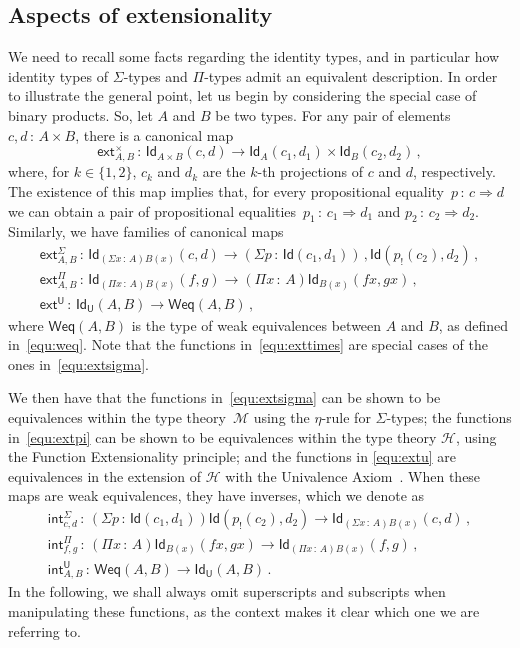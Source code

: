 \documentclass[10pt,a4paper,oneside,reqno]{amsart}
\numberwithin{equation}{section}
\theoremstyle{mythm}
\theoremstyle{mydef}
\theoremstyle{myrmk}
\newcommand{\co}{\,{:}\,}
\newcommand{\Hint}{\mathcal{H}}
\newcommand{\ext}{\mathsf{ext}}
\renewcommand{\int}{\mathsf{int}}
\newcommand{\Id}{\mathsf{Id}}
\newcommand{\U}{\mathsf{U}}
\begin{document}
\subsection*{Aspects of extensionality} We need to recall some facts regarding the identity types, and in particular how  identity types of $\Sigma$-types and $\Pi$-types admit an equivalent description. In order to illustrate the general point, let us begin by considering the special case of binary products. So, let $A$ and $B$ be two types. For any 
pair of elements $c, d  \co A \times B$, there is a canonical map
\begin{equation}
\label{equ:exttimes}
\ext^{\times}_{A, B}  \co \Id_{A \times B}(c, d) \to \Id_{A}(c_1, d_1) \times \Id_{B}(c_2, d_2) \, , 
\end{equation}
where, for $k \in \{ 1, 2 \}$,  $c_k$ and $d_k$ are the $k$-th projections of $c$ and $d$, respectively. The existence of this map implies that, for every 
propositional equality~$p \co c \Rightarrow d$ we can obtain a pair of propositional equalities~$p_1 \co c_1 \Rightarrow d_1$ and $p_2 \co c_2 \Rightarrow d_2$. Similarly, we
have families of canonical maps
\begin{gather}
\ext^\Sigma_{A,B} \co  \Id_{(\Sigma x \co A)B(x)}(c, d) \to (\Sigma p \co \Id(c_1, d_1)) \, , \Id( p_{!}(c_2), d_2) \, , 
\label{equ:extsigma} \\
\ext^\Pi_{A,B} \co  \Id_{(\Pi x \co A)B(x)}(f, g) \to (\Pi x \co A) \Id_{B(x)}(f x, gx)  \, , 
\label{equ:extpi} \\
\ext^\U \co  \Id_\U(A, B) \to \mathsf{Weq}(A, B) \, ,  \label{equ:extu}
\end{gather}
where $\mathsf{Weq}(A,B)$ is the type of weak equivalences between $A$ and $B$, as defined in~\eqref{equ:weq}.
Note that the functions in~\eqref{equ:exttimes} are special cases of the ones in~\eqref{equ:extsigma}.

We then have that the functions in~\eqref{equ:extsigma} can be shown to be 
equivalences within the type theory~$\mathcal{M}$ using the $\eta$-rule for $\Sigma$-types;
the functions in~\eqref{equ:extpi} can be shown to be equivalences within the type theory $\Hint$, using the Function Extensionality principle; and the functions in \eqref{equ:extu} are equivalences in the extension of $\Hint$ with the  Univalence Axiom~\cite{VoevodskyV:notts}. When these maps are weak equivalences, they have 
inverses, which we denote as 
\begin{gather}
\int^\Sigma_{c,d} \co   (\Sigma p \co \Id(c_1, d_1)) \Id( p_{!}(c_2), d_2) \to \Id_{(\Sigma x \co A)B(x)}(c, d) \, , 
\label{equ:intsigma} \\
\int^\Pi_{f, g} \co  (\Pi x \co A) \Id_{B(x)}(f x, gx) \to   \Id_{(\Pi x \co A)B(x)}(f, g) \, , 
\label{equ:intpi} \\
\int^\U_{A,B} \co  \mathsf{Weq}(A, B) \to \Id_\U(A, B)  \, .  \label{equ:intu}
\end{gather}
In the following, we shall always omit  superscripts and subscripts when manipulating these functions,
as the context makes it clear which one we are referring to. 
\end{document}
